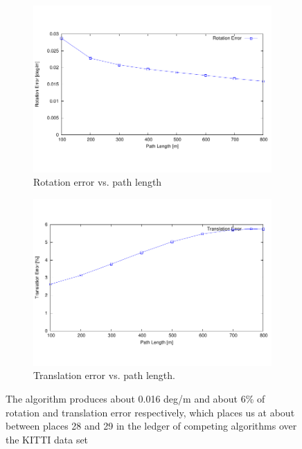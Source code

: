 \documentclass[10pt]{article}         %
\begin{document}
\begin{figure}[h]
    \centering
    \begin{subfigure}[b]{.49\textwidth}
    \includegraphics[width=1\textwidth]{00_rl}
    \caption{Rotation error vs. path length}
    \label{fig:rotation_error}
    \end{subfigure}
    \begin{subfigure}[b]{.49\textwidth}
    \includegraphics[width=1\textwidth]{00_tl}
    \caption{Translation error vs. path length.}
    \label{fig:translation_error}
    \end{subfigure}
    \caption{The algorithm produces about 0.016 deg/m and about 6\% of rotation and translation error respectively, which places us at about between places 28 and 29 in the ledger of competing algorithms over the KITTI data set}
    \label{fig:results}
\end{figure}
\end{document}
